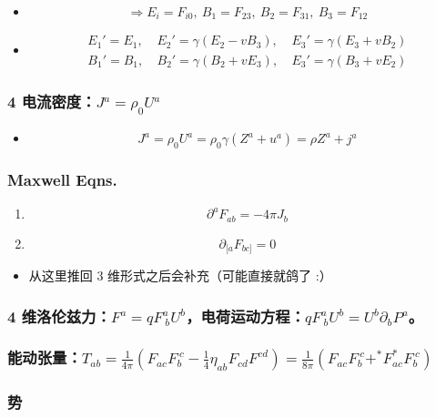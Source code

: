 \documentclass{article}
\begin{document}
\begin{itemize}
    \item $$\Rightarrow E_{i}=F_{i0},\ B_{1}=F_{23},\ B_{2}=F_{31},\ B_{3}=F_{12}$$
    \item $$\begin{aligned}
      E_1'=E_1,\ &E_2'=\gamma(E_2-vB_3),\ &E_3'=\gamma(E_3+vB_2)\\
      B_1'=B_1,\ &B_2'=\gamma(B_2+vE_3),\ &E_3'=\gamma(B_3+vE_2)
      \end{aligned}$$
\end{itemize}

\subsubsection{4 电流密度：$J^a=\rho_0U^a$}

\begin{itemize}
    \item $$J^a=\rho_0U^a=\rho_0\gamma(Z^a+u^a)=\rho Z^a+j^a$$
\end{itemize}

\subsubsection{Maxwell Eqns.}

\begin{enumerate}
    \item $$\partial^aF_{ab}=-4\pi J_b$$
    \item $$\partial_{[a}F_{bc]}=0$$
\end{enumerate}

\begin{itemize}
    \item 从这里推回 3 维形式之后会补充（可能直接就鸽了 :）
\end{itemize}

\subsubsection{4 维洛伦兹力：$F^a=qF^a_{\ b}U^b$，电荷运动方程：$qF^a_{\ b}U^b=U^b\partial_b P^a$。}

\subsubsection{能动张量：$T_{ab}=\frac{1}{4\pi}(F_{ac}F_{b}^{\ c}-\frac{1}{4}\eta_{ab}F_{cd}F^{cd})=\frac{1}{8\pi}(F_{ac}F_{b}^{\ c}+^*F_{ac}^*F_{b}^{\ c})$}

\subsubsection{势}
\end{document}

